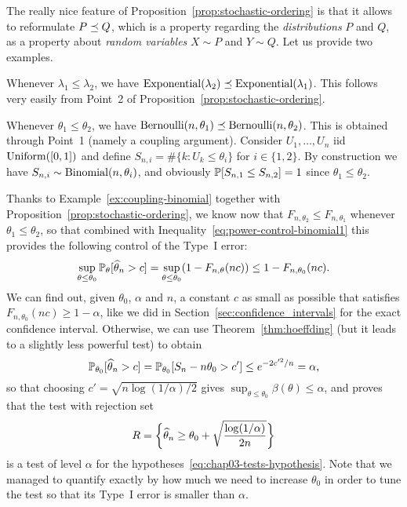 The really nice feature of Proposition~\ref{prop:stochastic-ordering} is that it allows to reformulate $P \lest Q$, which is a property regarding the \emph{distributions} $P$ and $Q$, as a property about \emph{random variables} $X \sim P$ and $Y \sim Q$.
Let us provide two examples.
\begin{example}
	Whenever $\lambda_1 \leq \lambda_2$, we have $\expo(\lambda_2) \lest \expo(\lambda_1)$. This follows very easily from Point~2 of Proposition~\ref{prop:stochastic-ordering}.
\end{example}
\begin{example}
	\label{ex:coupling-binomial}
	Whenever $\theta_1 \leq \theta_2$, we have $\ber(n, \theta_1) \lest \ber(n, \theta_2)$. This is obtained through Point~1 (namely a coupling argument).
	Consider $U_1, \ldots, U_n$ iid $\uni([0, 1])$ and define $S_{n, i} = \# \{ k : U_k \leq \theta_i \}$ for $i \in \{ 1, 2 \}$. By construction we have $S_{n, i} \sim \bin(n, \theta_i)$, and obviously $\P[S_{n, 1} \leq S_{n, 2}] = 1$ since $\theta_1 \leq \theta_2$.
\end{example}
Thanks to Example~\ref{ex:coupling-binomial} together with Proposition~\ref{prop:stochastic-ordering}, we know now that $F_{n, \theta_2} \leq F_{n, \theta_1}$ whenever $\theta_1 \leq \theta_2$, so that combined with Inequality~\eqref{eq:power-control-binomial1} this provides the following control of the Type~I error:
\begin{equation*}
	\sup_{\theta \leq \theta_0} \P_\theta[ \wh \theta_n > c] = \sup_{\theta \leq \theta_0} (1 - F_{n, \theta}(n c)) \leq 1 - F_{n, \theta_0}(n c).
\end{equation*}
We can find out, given $\theta_0$, $\alpha$ and $n$, a constant $c$ as small as possible that satisfies $F_{n, \theta_0}(n c) \geq 1 - \alpha$, like we did in Section~\ref{sec:confidence_intervals} for the exact confidence interval.
Otherwise, we can use Theorem~\ref{thm:hoeffding} (but it leads to a slightly less powerful test) to obtain
\begin{equation*}
	\P_{\theta_0} [\wh \theta_n > c] = \P_{\theta_0}[S_n - n \theta_0 > c'] \leq e^{-2 c'^2 / n} = \alpha,
\end{equation*}
so that choosing $c' = \sqrt{n \log(1 / \alpha) / 2}$ gives $\sup_{\theta \leq \theta_0} \beta(\theta) \leq \alpha$, and proves that the test with rejection set 
\begin{equation*}
	R = \bigg\{ \wh \theta_n \geq \theta_0 + \sqrt{ \frac{\log(1 / \alpha)}{2n}} \bigg\}
\end{equation*}
is a test of level $\alpha$ for the hypotheses~\eqref{eq:chap03-tests-hypothesis}.
Note that we managed to quantify exactly by how much we need to increase $\theta_0$ in order to tune the test so that its Type~I error is smaller than $\alpha$.

